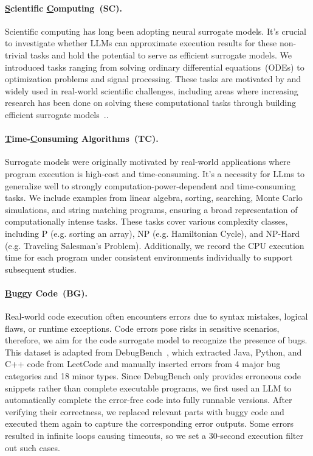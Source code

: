 \paragraph{\underline{S}cientific \underline{C}omputing~(SC).}

Scientific computing has long been adopting neural surrogate models. It's crucial to investigate whether LLMs can approximate execution results for these non-trivial tasks and hold the potential to serve as efficient surrogate models. We introduced tasks ranging from solving ordinary differential equations~(ODEs) to optimization problems and signal processing. These tasks are motivated by and widely used in real-world scientific challenges, including areas where increasing research has been done on solving these computational tasks through building efficient surrogate models~\citep{DBLP:journals/natmi/WuZLW23, journals/nature/0004LCXJJ023}..

\paragraph{\underline{T}ime-\underline{C}onsuming Algorithms~(TC).}
Surrogate models were originally motivated by real-world applications where program execution is high-cost and time-consuming. It's a necessity for LLms to generalize well to strongly computation-power-dependent and time-consuming tasks. We include examples from linear algebra, sorting, searching, Monte Carlo simulations, and string matching programs, ensuring a broad representation of computationally intense tasks. These tasks cover various complexity classes, including P (e.g. sorting an array), NP (e.g. Hamiltonian Cycle), and NP-Hard (e.g. Traveling Salesman's Problem). Additionally, we record the CPU execution time for each program under consistent environments individually to support subsequent studies.

\paragraph{\underline{B}u\underline{g}gy Code~(BG).}

Real-world code execution often encounters errors due to syntax mistakes, logical flaws, or runtime exceptions. Code errors pose risks in sensitive scenarios, therefore, we aim for the code surrogate model to recognize the presence of bugs. This dataset is adapted from DebugBench~\citep{tian2024debugbenchevaluatingdebuggingcapability}, which extracted Java, Python, and C++ code from LeetCode and manually inserted errors from 4 major bug categories and 18 minor types.
%
Since DebugBench only provides erroneous code snippets rather than complete executable programs, we first used an LLM to automatically complete the error-free code into fully runnable versions. After verifying their correctness, we replaced relevant parts with buggy code and executed them again to capture the corresponding error outputs. Some errors resulted in infinite loops causing timeouts, so we set a $30$-second execution filter out such cases.

